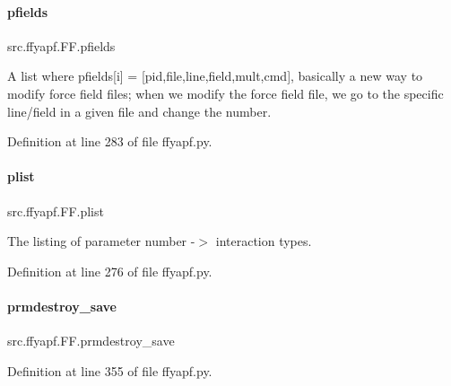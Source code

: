 \paragraph{\texorpdfstring{pfields}{pfields}}
{\footnotesize\ttfamily src.\+ffyapf.\+F\+F.\+pfields}



A list where pfields\mbox{[}i\mbox{]} = \mbox{[}pid,\textquotesingle{}file\textquotesingle{},line,field,mult,cmd\mbox{]}, basically a new way to modify force field files; when we modify the force field file, we go to the specific line/field in a given file and change the number. 



Definition at line 283 of file ffyapf.\+py.

\mbox{\label{classsrc_1_1ffyapf_1_1FF_a600c53e8b497f3cd6033ad04697fb40c}} 
\paragraph{\texorpdfstring{plist}{plist}}
{\footnotesize\ttfamily src.\+ffyapf.\+F\+F.\+plist}



The listing of parameter number -\/$>$ interaction types. 



Definition at line 276 of file ffyapf.\+py.

\mbox{\label{classsrc_1_1ffyapf_1_1FF_abb8aab8aafc7bfe637d5fcf226debaad}} 
\paragraph{\texorpdfstring{prmdestroy\+\_\+save}{prmdestroy\_save}}
{\footnotesize\ttfamily src.\+ffyapf.\+F\+F.\+prmdestroy\+\_\+save}



Definition at line 355 of file ffyapf.\+py.

\mbox{\label{classsrc_1_1ffyapf_1_1FF_a75537037c3d897b85f7d54b45dbca014}} 
